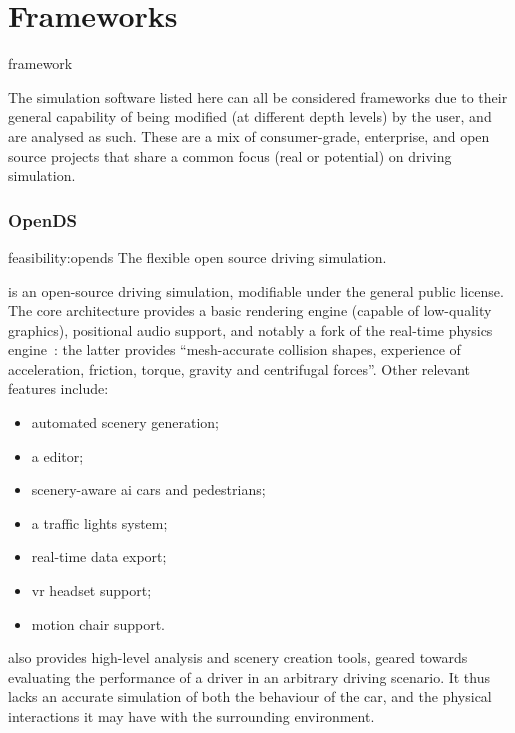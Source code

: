 \section{Frameworks}\label{sc:stateoftheart:frameworks}

\begin{definition}{framework}
\end{definition}

The simulation software listed here can all be considered \glspl{framework} due to their general capability of being modified (at different depth levels) by the user, and are analysed as such. These are a mix of consumer-grade, enterprise, and open source projects that share a common focus (real or potential) on driving simulation.

\subsubsection{OpenDS}

\begin{excerpt}{feasibility:opends}
    The flexible open source driving simulation.
\end{excerpt}

 is an open-source driving simulation, modifiable under the  general public license. The core architecture provides a basic rendering engine (capable of low-quality graphics), positional audio support, and notably a  fork of the  real-time physics engine~\cite{feasibility:bullet}: the latter provides \enquote{mesh-accurate collision shapes, experience of acceleration, friction, torque, gravity and centrifugal forces}{\cite{feasibility:opendsfeatures}}. Other relevant features include:

\begin{itemize}
    \item automated scenery generation;
    \item a  editor;
	\item scenery-aware \gls{ai} cars and pedestrians;
    \item a traffic lights system;
    \item real-time data export;
    \item {} \gls{vr} headset support;
    \item motion chair support.
\end{itemize}

 also provides high-level analysis and scenery creation tools, geared towards evaluating the performance of a driver in an arbitrary driving scenario. It thus lacks an accurate simulation of both the behaviour of the car, and the physical interactions it may have with the surrounding environment.

